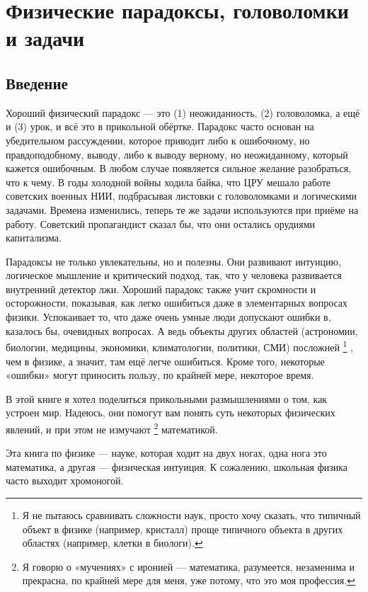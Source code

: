 \chapter[Парадоксы, головоломки, задачи]{Физические парадоксы, головоломки и задачи}

\section{Введение}

Хороший физический парадокс --- это (1) неожиданность, (2) головоломка, а ещё и (3) урок, и всё это в прикольной обёртке.
Парадокс часто основан на убедительном рассуждении, которое приводит либо к ошибочному, но правдоподобному, выводу, либо к выводу верному, но неожиданному, который кажется ошибочным.
В любом случае появляется сильное желание разобраться, что к чему.
В годы холодной войны ходила байка, что ЦРУ мешало работе советских военных НИИ, подбрасывая листовки с головоломками и логическими задачами.
Времена изменились, теперь те же задачи используются при приёме на работу.
Советский пропагандист сказал бы, что они остались орудиями капитализма.

Парадоксы не только увлекательны, но и полезны.
Они развивают интуицию, логическое мышление и критический подход, так, что
у человека развивается внутренний детектор лжи.
Хороший парадокс также учит скромности и осторожности, показывая, как легко ошибиться даже в элементарных вопросах физики.
Успокаивает то, что даже очень умные люди допускают ошибки в, казалось бы, очевидных вопросах.
А ведь объекты других областей (астрономии, биологии, медицины, экономики, климатологии, политики, СМИ) посложней%
\footnote{Я не пытаюсь сравнивать сложности наук, просто хочу сказать, что типичный объект в физике (например, кристалл) проще типичного объекта в других областях (например, клетки в биологи).}%
, чем в физике, а значит, там ещё легче ошибиться.
Кроме того, некоторые «ошибки» могут приносить пользу, по крайней мере, некоторое время.

В этой книге я хотел поделиться прикольными размышлениями о том, как устроен мир.
Надеюсь, они помогут вам понять суть некоторых физических явлений, и при этом не измучают%
\footnote{Я говорю о «мучениях» с иронией --- математика, разумеется, незаменима и прекрасна, по крайней мере для меня, уже потому, что это моя профессия.}
математикой.

Эта книга по физике --- науке, которая ходит на двух ногах, одна нога это математика, а другая --- физическая интуиция.
К сожалению, школьная физика часто выходит хромоногой.


